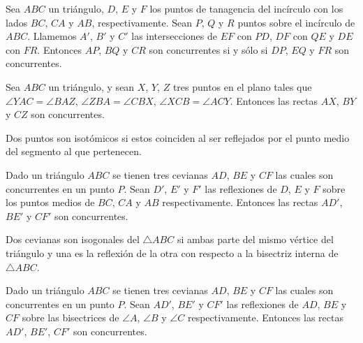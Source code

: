 \begin{section-theorem.tcb}
    Sea $ABC$ un triángulo, $D$, $E$ y $F$ los puntos de tanagencia del incírculo con los lados $BC$, $CA$ y $AB$, respectivamente.
    Sean $P$, $Q$ y $R$ puntos sobre el incírculo de $ABC$.
    Llamemos $A'$, $B'$ y $C'$ las intersecciones de $EF$ con $PD$, $DF$ con $QE$ y $DE$ con $FR$.
    Entonces $AP$, $BQ$ y $CR$ son concurrentes si y sólo si $DP$, $EQ$ y $FR$ son concurrentes.
\end{section-theorem.tcb}

\begin{section-theorem.tcb}
    Sea $ABC$ un triángulo, y sean $X$, $Y$, $Z$ tres puntos en el plano tales que $\angle YAC = \angle BAZ$, $\angle ZBA = \angle CBX$, $\angle XCB = \angle ACY$.
    Entonces las rectas $AX$, $BY$ y $CZ$ son concurrentes.
\end{section-theorem.tcb}

\begin{section-definition.tcb}
    Dos puntos son isotómicos si estos coinciden al ser reflejados por el punto medio del segmento al que pertenecen.
\end{section-definition.tcb}

\begin{section-definition.tcb}
    Dado un triángulo $ABC$ se tienen tres cevianas $AD$, $BE$ y $CF$ las cuales son concurrentes en un punto $P$.
    Sean $D'$, $E'$ y $F'$ las reflexiones de $D$, $E$ y $F$ sobre los puntos medios de $BC$, $CA$ y $AB$ respectivamente.
    Entonces las rectas $AD'$, $BE'$ y $CF'$ son concurrentes.
\end{section-definition.tcb}

\begin{section-definition.tcb}
    Dos cevianas son isogonales del $\triangle ABC$ si ambas parte del mismo vértice del triángulo y una es la reflexión de la otra con respecto a la bisectriz interna de $\triangle ABC$.
\end{section-definition.tcb}

\begin{section-definition.tcb}
    Dado un triángulo $ABC$ se tienen tres cevianas $AD$, $BE$ y $CF$ las cuales son concurrentes en un punto $P$.
    Sean $AD'$, $BE'$ y $CF'$ las reflexiones de $AD$, $BE$ y $CF$ sobre las bisectrices de $\angle A$, $\angle B$ y $\angle C$ respectivamente.
    Entonces las rectas $AD'$, $BE'$, $CF'$ son concurrentes.
\end{section-definition.tcb}




